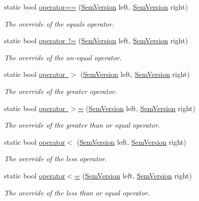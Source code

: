 \begin{DoxyCompactItemize}
static bool \mbox{\hyperlink{class_semver_1_1_sem_version_aff575c02e2b0eaa74e2aee6da139f315}{operator==}} (\mbox{\hyperlink{class_semver_1_1_sem_version}{Sem\+Version}} left, \mbox{\hyperlink{class_semver_1_1_sem_version}{Sem\+Version}} right)
\begin{DoxyCompactList}\small\item\em The override of the equals operator. \end{DoxyCompactList}\item 
static bool \mbox{\hyperlink{class_semver_1_1_sem_version_ab0eb279a6d17558b7b134359f8179ff4}{operator !=}} (\mbox{\hyperlink{class_semver_1_1_sem_version}{Sem\+Version}} left, \mbox{\hyperlink{class_semver_1_1_sem_version}{Sem\+Version}} right)
\begin{DoxyCompactList}\small\item\em The override of the un-\/equal operator. \end{DoxyCompactList}\item 
static bool \mbox{\hyperlink{class_semver_1_1_sem_version_a7206817504d2de152c454cfda9e3bd71}{operator $>$}} (\mbox{\hyperlink{class_semver_1_1_sem_version}{Sem\+Version}} left, \mbox{\hyperlink{class_semver_1_1_sem_version}{Sem\+Version}} right)
\begin{DoxyCompactList}\small\item\em The override of the greater operator. \end{DoxyCompactList}\item 
static bool \mbox{\hyperlink{class_semver_1_1_sem_version_a9bb9a799d7f3292569ec3ed2e7a95c56}{operator $>$=}} (\mbox{\hyperlink{class_semver_1_1_sem_version}{Sem\+Version}} left, \mbox{\hyperlink{class_semver_1_1_sem_version}{Sem\+Version}} right)
\begin{DoxyCompactList}\small\item\em The override of the greater than or equal operator. \end{DoxyCompactList}\item 
static bool \mbox{\hyperlink{class_semver_1_1_sem_version_a2d6cd9e1f8b7ce8649582170471f4e33}{operator$<$}} (\mbox{\hyperlink{class_semver_1_1_sem_version}{Sem\+Version}} left, \mbox{\hyperlink{class_semver_1_1_sem_version}{Sem\+Version}} right)
\begin{DoxyCompactList}\small\item\em The override of the less operator. \end{DoxyCompactList}\item 
static bool \mbox{\hyperlink{class_semver_1_1_sem_version_a235b920e8e35516c891e59f8bf5b9aef}{operator$<$=}} (\mbox{\hyperlink{class_semver_1_1_sem_version}{Sem\+Version}} left, \mbox{\hyperlink{class_semver_1_1_sem_version}{Sem\+Version}} right)
\begin{DoxyCompactList}\small\item\em The override of the less than or equal operator. \end{DoxyCompactList}\end{DoxyCompactItemize}
